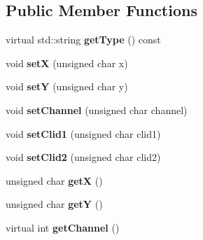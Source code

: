 \subsection*{Public Member Functions}
\begin{DoxyCompactItemize}
\item 
\hypertarget{classemorph_1_1CollisionEvent_a2da76f2bb1ce603a50221228b2465bf5}{virtual std\-::string {\bfseries get\-Type} () const }\label{classemorph_1_1CollisionEvent_a2da76f2bb1ce603a50221228b2465bf5}

\item 
\hypertarget{classemorph_1_1CollisionEvent_a167522df5c67b6156235e99ff636682a}{void {\bfseries set\-X} (unsigned char x)}\label{classemorph_1_1CollisionEvent_a167522df5c67b6156235e99ff636682a}

\item 
\hypertarget{classemorph_1_1CollisionEvent_a0ee83443e28c0acfc221851192386fa4}{void {\bfseries set\-Y} (unsigned char y)}\label{classemorph_1_1CollisionEvent_a0ee83443e28c0acfc221851192386fa4}

\item 
\hypertarget{classemorph_1_1CollisionEvent_a574b19f46b81c78ce52b14027a5b7a02}{void {\bfseries set\-Channel} (unsigned char channel)}\label{classemorph_1_1CollisionEvent_a574b19f46b81c78ce52b14027a5b7a02}

\item 
\hypertarget{classemorph_1_1CollisionEvent_a6b573077944ecf238c85c1f963bda3ba}{void {\bfseries set\-Clid1} (unsigned char clid1)}\label{classemorph_1_1CollisionEvent_a6b573077944ecf238c85c1f963bda3ba}

\item 
\hypertarget{classemorph_1_1CollisionEvent_a95f28c93a0e7766bae5c179ec86761de}{void {\bfseries set\-Clid2} (unsigned char clid2)}\label{classemorph_1_1CollisionEvent_a95f28c93a0e7766bae5c179ec86761de}

\item 
\hypertarget{classemorph_1_1CollisionEvent_a94096519704b6390649a9e58e74df3fd}{unsigned char {\bfseries get\-X} ()}\label{classemorph_1_1CollisionEvent_a94096519704b6390649a9e58e74df3fd}

\item 
\hypertarget{classemorph_1_1CollisionEvent_a5115fb53d33275f30f39655bdc5de100}{unsigned char {\bfseries get\-Y} ()}\label{classemorph_1_1CollisionEvent_a5115fb53d33275f30f39655bdc5de100}

\item 
\hypertarget{classemorph_1_1CollisionEvent_a7041563ffa86c57f5570b059d6e1b371}{virtual int {\bfseries get\-Channel} ()}\label{classemorph_1_1CollisionEvent_a7041563ffa86c57f5570b059d6e1b371}


\end{DoxyCompactItemize}
